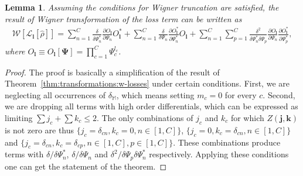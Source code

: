 \documentclass[12pt,aip,jmp,amssymb,amsmath]{revtex4-1}
\newcommand{\jvec}{\boldsymbol{j}}
\newcommand{\kvec}{\boldsymbol{k}}
\newcommand{\lvec}{\boldsymbol{l}}
\newcommand{\Psivec}{\boldsymbol{\Psi}}
\newcommand{\restbasis}{\mathbb{M}}
\newcommand{\thmref}[1]{Theorem~\ref{thm:#1}}
\newtheorem{lemma}{Lemma}
\begin{document}
\begin{lemma}
    Assuming the conditions for Wigner truncation are satisfied, the result of Wigner transformation of the loss term can be written as
    \begin{equation*}\begin{split}
        \mathcal{W}[\mathcal{L}_{\lvec}[\hat{\rho}]]
        = \sum_{n=1}^C
                \frac{\delta}{\delta \Psi_n^*} \frac{\partial O_{\lvec}}{\partial \Psi_n} O_{\lvec}^*
        + \sum_{n=1}^C
            \frac{\delta}{\delta \Psi_n} \frac{\partial O_{\lvec}^*}{\partial \Psi_n^*} O_{\lvec}
        + \sum_{n=1}^C \sum_{p=1}^C
            \frac{\delta^2}{\delta \Psi_n^* \delta \Psi_p}
            \frac{\partial O_{\lvec}}{\partial \Psi_n}
            \frac{\partial O_{\lvec}^*}{\partial \Psi_p^*},
    \end{split}\end{equation*}
    where $O_{\lvec} \equiv O_{\lvec}[\Psivec] = \prod_{c=1}^C \Psi_c^{l_c}$.
\end{lemma}
\begin{proof}
The proof is basically a simplification of the result of \thmref{transformations:w-losses} under certain conditions.
First, we are neglecting all occurrences of $\delta_{\restbasis}$, which means setting $m_c = 0$ for every $c$.
Second, we are dropping all terms with high order differentials,
which can be expressed as limiting $\sum j_c + \sum k_c \le 2$.
The only combinations of $j_c$ and $k_c$ for which $Z(\jvec, \kvec)$ is not zero are thus
$\{ j_c = \delta_{cn}, k_c = 0, n \in [1, C] \}$,
$\{ j_c = 0, k_c = \delta_{cn}, n \in [1, C] \}$ and
$\{ j_c = \delta_{cn}, k_c = \delta_{cp}, n \in [1, C], p \in [1, C] \}$.
These combinations produce terms with $\delta/\delta \Psi_n^*$,
$\delta/\delta \Psi_n$ and
$\delta^2/\delta \Psi_p \delta \Psi_n^*$ respectively.
Applying these conditions one can get the statement of the theorem.
\end{proof}
\end{document}
